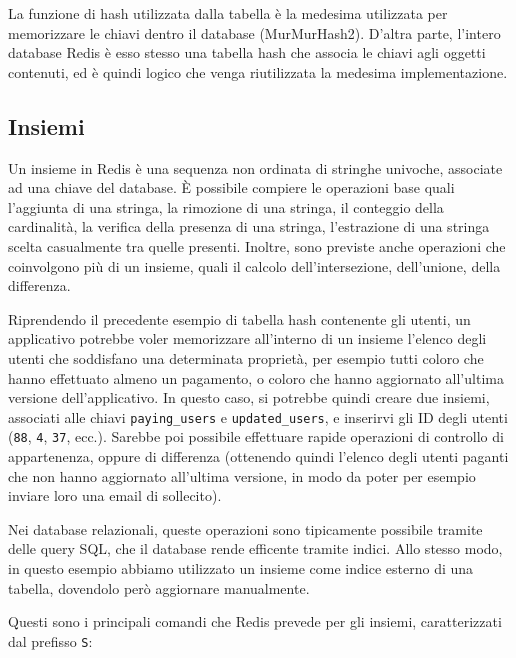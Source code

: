 La funzione di hash utilizzata dalla tabella è la medesima utilizzata per memorizzare le chiavi
dentro il database (MurMurHash2). D'altra parte, l'intero database Redis è esso stesso una tabella
hash che associa le chiavi agli oggetti contenuti, ed è quindi logico che venga riutilizzata la
medesima implementazione.

\subsection{Insiemi}

Un insieme in Redis è una sequenza non ordinata di stringhe univoche, associate ad una chiave del
database. È possibile compiere le operazioni base quali l'aggiunta di una stringa, la rimozione di
una stringa, il conteggio della cardinalità, la verifica della presenza di una stringa, l'estrazione
di una stringa scelta casualmente tra quelle presenti. Inoltre, sono previste anche operazioni che
coinvolgono più di un insieme, quali il calcolo dell'intersezione, dell'unione, della differenza.

Riprendendo il precedente esempio di tabella hash contenente gli utenti, un applicativo potrebbe
voler memorizzare all'interno di un insieme l'elenco degli utenti che soddisfano una determinata
proprietà, per esempio tutti coloro che hanno effettuato almeno un pagamento, o coloro che hanno
aggiornato all'ultima versione dell'applicativo. In questo caso, si potrebbe quindi creare due
insiemi, associati alle chiavi \verb|paying_users| e \verb|updated_users|, e inserirvi gli ID degli
utenti (\verb|88|, \verb|4|, \verb|37|, ecc.). Sarebbe poi possibile effettuare rapide operazioni di
controllo di appartenenza, oppure di differenza (ottenendo quindi l'elenco degli utenti paganti che
non hanno aggiornato all'ultima versione, in modo da poter per esempio inviare loro una email di
sollecito).

Nei database relazionali, queste operazioni sono tipicamente possibile tramite delle query SQL, che
il database rende efficente tramite indici. Allo stesso modo, in questo esempio abbiamo utilizzato
un insieme come indice esterno di una tabella, dovendolo però aggiornare manualmente.

Questi sono i principali comandi che Redis prevede per gli insiemi, caratterizzati dal prefisso
\verb|S|:

